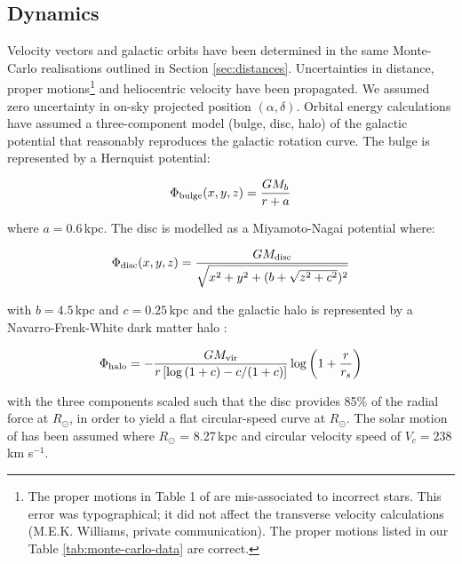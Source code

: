 \documentclass{emulateapj}
\begin{document}
\subsection{Dynamics}

Velocity vectors and galactic orbits have been determined in the same Monte-Carlo realisations outlined in Section \ref{sec:distances}. Uncertainties in distance, proper motions\footnote{The proper motions in Table 1 of \citet{williams;et-al_2011} are mis-associated to incorrect stars. This error was typographical; it did not affect the transverse velocity calculations (M.E.K. Williams, private communication). The proper motions listed in our Table \ref{tab:monte-carlo-data} are correct.} and heliocentric velocity have been propagated. We assumed zero uncertainty in on-sky projected position $(\alpha, \delta)$. Orbital energy calculations have assumed a three-component model (bulge, disc, halo) of the galactic potential that reasonably reproduces the galactic rotation curve. The bulge is represented by a Hernquist potential:

\begin{equation}
	\Phi_{\rm bulge}(x, y, z) = \frac{GM_b}{r + a}
\end{equation}

\noindent where $a = 0.6$\,kpc. The disc is modelled as a Miyamoto-Nagai potential \citep{miyamoto;nagai_1975} where:

\begin{equation}
	\Phi_{\rm disc}(x, y, z) = \frac{GM_{\rm disc}}{\sqrt{x^2 + y^2 + (b + \sqrt{z^2 + c^2})^2}}
\end{equation}

\noindent with $b = 4.5$\,kpc and $c = 0.25$\,kpc and the galactic halo is represented by a Navarro-Frenk-White dark matter halo \citep{navarro;et-al_1997}:

\begin{equation}
	\Phi_{\rm halo} = -\frac{GM_{\rm vir}}{r\left[\log{(1 + c)} - c/(1 + c)\right]}\log{\left(1 + \frac{r}{r_s}\right)}
\end{equation}

\noindent{}with the three components scaled such that the disc provides 85\% of the radial force at $R_\odot$, in order to yield a flat circular-speed curve at $R_\odot$. The solar motion of \citet{schonrich;et-al_2012} has been assumed where $R_\odot$ = 8.27\,kpc and circular velocity speed of $V_c = 238$\,km s$^{-1}$.

\end{document}
